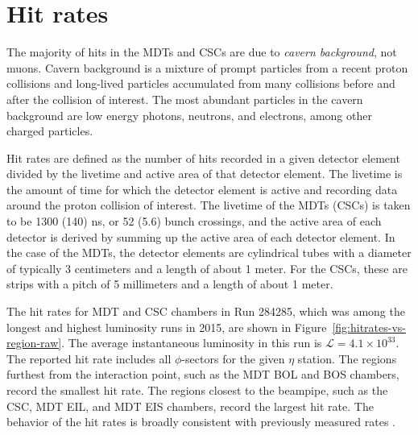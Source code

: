 \section{Hit rates}
\label{sec:hitrates}

The majority of hits in the MDTs and CSCs are due to \textit{cavern background}, not muons. Cavern background is a mixture of prompt particles from a recent proton collisions and long-lived particles accumulated from many collisions before and after the collision of interest. The most abundant particles in the cavern background are low energy photons, neutrons, and electrons, among other charged particles.

Hit rates are defined as the number of hits recorded in a given detector element divided by the livetime and active area of that detector element. The livetime is the amount of time for which the detector element is active and recording data around the proton collision of interest. The livetime of the MDTs (CSCs) is taken to be 1300 (140) ns, or 52 (5.6) bunch crossings, and the active area of each detector is derived by summing up the active area of each detector element. In the case of the MDTs, the detector elements are cylindrical tubes with a diameter of typically 3 centimeters and a length of about 1 meter. For the CSCs, these are strips with a pitch of 5 millimeters and a length of about 1 meter.

The hit rates for MDT and CSC chambers in Run 284285, which was among the longest and highest luminosity runs in 2015, are shown in Figure~\ref{fig:hitrates-vs-region-raw}. The average instantaneous luminosity in this run is $\mathcal{L}=4.1\times10^{33}$. The reported hit rate includes all $\phi$-sectors for the given $\eta$ station. The regions furthest from the interaction point, such as the MDT BOL and BOS chambers, record the smallest hit rate. The regions closest to the beampipe, such as the CSC, MDT EIL, and MDT EIS chambers, record the largest hit rate. The behavior of the hit rates is broadly consistent with previously measured rates \cite{ATL-COM-MUON-2013-003,ATL-COM-MUON-2013-011}.


